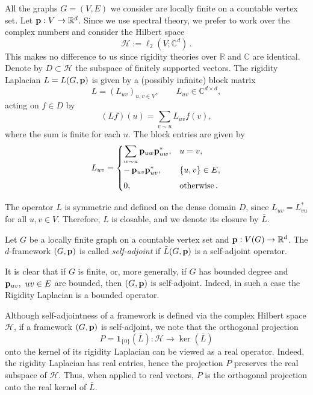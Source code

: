 \documentclass[reqno,english]{amsart}
\numberwithin{equation}{section}
\theoremstyle{definition}{
\newtheorem{example}[theorem]{Example}
\newtheorem{definition}[theorem]{Definition}
\newtheorem*{definition*}{Definition}
\newtheorem{problem}[theorem]{Problem}
\newtheorem{question}[theorem]{Question}
}
\newcommand{\R}{\mathbb R}
\newcommand{\C}{\mathbb C}
\newcommand{\cH}{\mathcal H}
\newcommand{\p}{{\bf p}}
\begin{document}
All the graphs $G=(V,E)$ we consider
are locally finite on a countable vertex set. Let $\p:V\to\R^d$. Since we use spectral theory, we prefer to work over the complex numbers and consider the Hilbert space
\[
\cH:=\ell_2(V;\C^d)\,.
\]
This makes no difference to us since rigidity theories over $\R$ and $\C$ are identical. Denote by $D\subset\cH$ the subspace of finitely supported vectors. The rigidity Laplacian $L=L(G,\p)$ is given by a (possibly infinite) block matrix
\[
L=(L_{uv})_{u,v\in V}, \qquad 
L_{uv}\in\C^{d\times d},
\]
acting on $f\in D$ by
\[
(L f)(u)=\sum_{v\sim u}L_{uv} f(v),
\]
where the sum is finite for each $u$. The block entries are given by
\begin{equation}\label{eq:Luv}
L_{uv}=
\begin{cases}
\displaystyle \sum_{w\sim u} \p_{uw}\p_{uw}^{*}, & u=v,\\[1ex]
\displaystyle -\,\p_{uv}\p_{uv}^{*}, & \{u,v\}\in E,\\[1ex]
0, & \text{otherwise}\,.
\end{cases}
\end{equation}


The operator $L$ is symmetric and defined on the dense domain $D$, since $L_{uv}=L_{vu}^*$ for all $u,v\in V$. Therefore, $L$ is closable, and we denote its closure by $\bar L$.

\begin{definition}
Let $G$ be a locally finite graph on a countable vertex set and $\p:V(G)\to\R^d$.
The $d$-framework $(G,\p)$ is called \emph{self-adjoint} if $\bar L(G,\p)$ is a self-adjoint operator.
\end{definition}
It is clear that if $G$ is finite, or, more generally, if $G$ has bounded degree and $\p_{uv},~uv\in E$ are bounded, then $(G,\p)$ is self-adjoint. Indeed, in such a case the Rigidity Laplacian is a bounded operator.

Although self-adjointness of a framework is defined via the complex Hilbert
space \(\cH\), if a framework \((G,\p)\) is self-adjoint, we note that the
orthogonal projection
\[
  P=\mathbf 1_{\{0\}}(\bar L):\cH\to \ker(\bar L)
\]
onto the kernel of its rigidity Laplacian can be viewed as a real operator. Indeed, the
rigidity Laplacian has real entries, hence the projection \(P\) preserves the real subspace of $\cH$.
Thus, when applied to real vectors, \(P\) is the orthogonal projection onto
the real kernel of \(\bar L\). 
\end{document}

